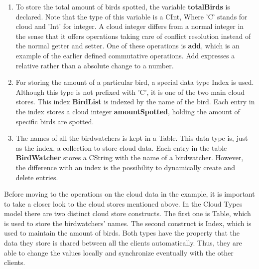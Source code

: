 \documentclass[a4paper,12pt]{report}
\begin{document}
\begin{enumerate}
    \item To store the total amount of birds spotted, the variable \textbf{totalBirds} is declared. Note that the type of this variable is a \textcolor{codedarkblue}{CInt}, Where 'C' stands for cloud and 'Int' for integer. A cloud integer differs from a normal integer in the sense that it offers operations taking care of conflict resolution instead of the normal getter and setter. One of these operations is \textbf{add}, which is an example of the earlier defined commutative operations. Add expresses a relative rather than a absolute change to a number.
    \item For storing the amount of a particular bird, a special data type \textcolor{codeblue}{Index} is used. Although this type is not prefixed with 'C', it is one of the two main cloud stores. This index \textbf{BirdList} is indexed by the name of the bird. Each entry in the index stores a cloud integer \textbf{amountSpotted}, holding the amount of specific birds are spotted. 
    \item The names of all the birdwatchers is kept in a \textcolor{codeblue}{Table}. This data type is, just as the index, a collection to store cloud data. Each entry in the table \textbf{BirdWatcher} stores a \textcolor{codedarkblue}{CString} with the name of a birdwatcher. However, the difference with an index is the possibility to dynamically create and delete entries.
\end{enumerate}

Before moving to the operations on the cloud data in the example, it is important to take a closer look to the cloud stores mentioned above. In the Cloud Types model there are two distinct cloud store constructs. The first one is \textcolor{codedarkblue}{Table}, which is used to store the birdwatchers' names. The second construct is \textcolor{codedarkblue}{Index}, which is used to maintain the amount of birds. Both types have the property that the data they store is shared between all the clients automatically. Thus, they are able to change the values locally and synchronize eventually with the other clients. \\ 
\end{document}

